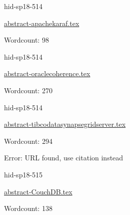 \begin{IU}

hid-sp18-514

\href{https://github.com/cloudmesh-community/hid-sp18-514/blob/master//technology/abstract-apachekaraf.tex}{abstract-apachekaraf.tex}

 

Wordcount: 98

\end{IU}



\begin{IU}

hid-sp18-514

\href{https://github.com/cloudmesh-community/hid-sp18-514/blob/master//technology/abstract-oraclecoherence.tex}{abstract-oraclecoherence.tex}

 

Wordcount: 270

\end{IU}



\begin{IU}

hid-sp18-514

\href{https://github.com/cloudmesh-community/hid-sp18-514/blob/master//technology/abstract-tibcodatasynapsegridserver.tex}{abstract-tibcodatasynapsegridserver.tex}

 

Wordcount: 294

Error: URL found, use citation instead
\end{IU}



\begin{IU}

hid-sp18-515

\href{https://github.com/cloudmesh-community/hid-sp18-515/blob/master//technology/abstract-CouchDB.tex}{abstract-CouchDB.tex}

 

Wordcount: 138

\end{IU}



